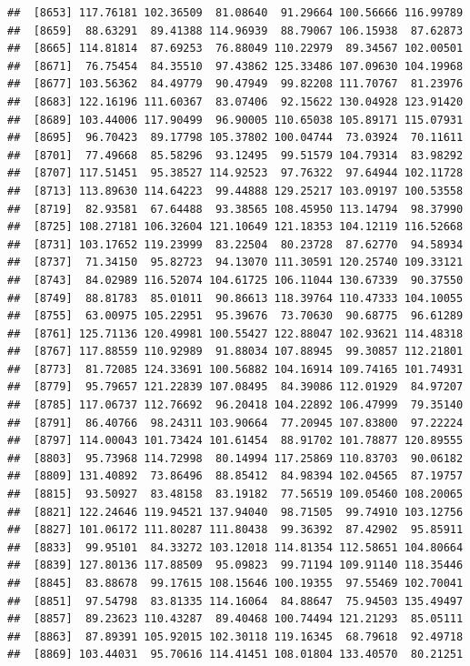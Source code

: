 \documentclass[
]{article}
\begin{document}
\begin{verbatim}
##  [8653] 117.76181 102.36509  81.08640  91.29664 100.56666 116.99789
##  [8659]  88.63291  89.41388 114.96939  88.79067 106.15938  87.62873
##  [8665] 114.81814  87.69253  76.88049 110.22979  89.34567 102.00501
##  [8671]  76.75454  84.35510  97.43862 125.33486 107.09630 104.19968
##  [8677] 103.56362  84.49779  90.47949  99.82208 111.70767  81.23976
##  [8683] 122.16196 111.60367  83.07406  92.15622 130.04928 123.91420
##  [8689] 103.44006 117.90499  96.90005 110.65038 105.89171 115.07931
##  [8695]  96.70423  89.17798 105.37802 100.04744  73.03924  70.11611
##  [8701]  77.49668  85.58296  93.12495  99.51579 104.79314  83.98292
##  [8707] 117.51451  95.38527 114.92523  97.76322  97.64944 102.11728
##  [8713] 113.89630 114.64223  99.44888 129.25217 103.09197 100.53558
##  [8719]  82.93581  67.64488  93.38565 108.45950 113.14794  98.37990
##  [8725] 108.27181 106.32604 121.10649 121.18353 104.12119 116.52668
##  [8731] 103.17652 119.23999  83.22504  80.23728  87.62770  94.58934
##  [8737]  71.34150  95.82723  94.13070 111.30591 120.25740 109.33121
##  [8743]  84.02989 116.52074 104.61725 106.11044 130.67339  90.37550
##  [8749]  88.81783  85.01011  90.86613 118.39764 110.47333 104.10055
##  [8755]  63.00975 105.22951  95.39676  73.70630  90.68775  96.61289
##  [8761] 125.71136 120.49981 100.55427 122.88047 102.93621 114.48318
##  [8767] 117.88559 110.92989  91.88034 107.88945  99.30857 112.21801
##  [8773]  81.72085 124.33691 100.56882 104.16914 109.74165 101.74931
##  [8779]  95.79657 121.22839 107.08495  84.39086 112.01929  84.97207
##  [8785] 117.06737 112.76692  96.20418 104.22892 106.47999  79.35140
##  [8791]  86.40766  98.24311 103.90664  77.20945 107.83800  97.22224
##  [8797] 114.00043 101.73424 101.61454  88.91702 101.78877 120.89555
##  [8803]  95.73968 114.72998  80.14994 117.25869 110.83703  90.06182
##  [8809] 131.40892  73.86496  88.85412  84.98394 102.04565  87.19757
##  [8815]  93.50927  83.48158  83.19182  77.56519 109.05460 108.20065
##  [8821] 122.24646 119.94521 137.94040  98.71505  99.74910 103.12756
##  [8827] 101.06172 111.80287 111.80438  99.36392  87.42902  95.85911
##  [8833]  99.95101  84.33272 103.12018 114.81354 112.58651 104.80664
##  [8839] 127.80136 117.88509  95.09823  99.71194 109.91140 118.35446
##  [8845]  83.88678  99.17615 108.15646 100.19355  97.55469 102.70041
##  [8851]  97.54798  83.81335 114.16064  84.88647  75.94503 135.49497
##  [8857]  89.23623 110.43287  89.40468 100.74494 121.21293  85.05111
##  [8863]  87.89391 105.92015 102.30118 119.16345  68.79618  92.49718
##  [8869] 103.44031  95.70616 114.41451 108.01804 133.40570  80.21251

\end{verbatim}
\end{document}

